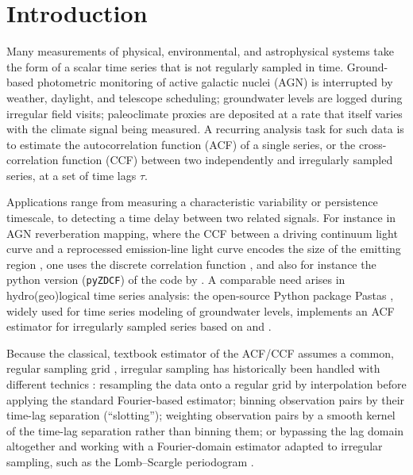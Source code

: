 \documentclass[twocolumn,10pt]{article}
\newcommand{\pyzdcf}{\texttt{pyZDCF}\xspace}
\begin{document}
\section{Introduction}
\label{sec:introduction}
Many measurements of physical, environmental, and astrophysical systems
take the form of a scalar time series that is not regularly sampled in
time. Ground-based photometric monitoring of active galactic nuclei (AGN)
is interrupted by weather, daylight, and telescope scheduling; groundwater
levels are logged during irregular field visits; paleoclimate proxies are
deposited at a rate that itself varies with the climate signal being
measured. A recurring analysis task for such data is to estimate the
autocorrelation function (ACF) of a single series, or the
cross-correlation function (CCF) between two independently and
irregularly sampled series, at a set of time lags $\tau$.

Applications range from measuring a characteristic variability or
persistence timescale, to detecting a time delay between two related
signals. For instance in AGN reverberation mapping, where the CCF between
a driving continuum light curve and a reprocessed emission-line light
curve encodes the size of the emitting region
\citep{2024HEAD...2110218W,asna.20210090,2021AJ....162..206S,
	2019MNRAS.485.4790S,2014AdSpR..54.1414K}, one uses the discrete
correlation function \citep{edelson1988}, and also for instance the
python version (\pyzdcf) of the code by \cite{alexander97}. A comparable
need arises in hydro(geo)logical time series analysis: the open-source
Python package Pastas \citep{collenteur2019}, widely used for time series
modeling of groundwater levels, implements an ACF estimator for
irregularly sampled series based on \cite{Rehfeld2011} and
\cite{edelson1988}.

Because the classical, textbook estimator of the ACF/CCF assumes a
common, regular sampling grid \citep[e.g.][]{astsa2026}, irregular sampling has historically been
handled with different technics \citep[see][]{Kreutzer2013,Rehfeld2011}: resampling the data onto a
regular grid by interpolation before applying the standard Fourier-based
estimator; binning observation pairs by their time-lag separation
(``slotting''); weighting observation pairs by a smooth kernel of the
time-lag separation rather than binning them; or bypassing the lag domain
altogether and working with a Fourier-domain estimator adapted to
irregular sampling, such as the Lomb--Scargle periodogram \citep{2018ApJS..236...16V,1982ApJ...263..835S,1976Ap&SS..39..447L}. 
\end{document}
